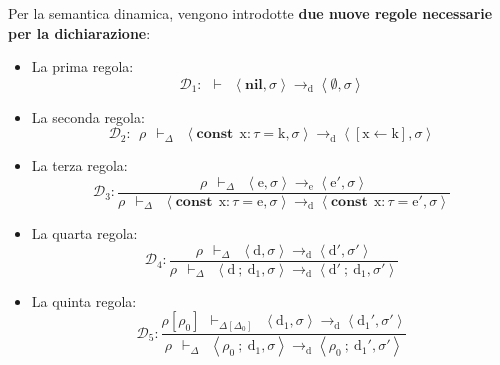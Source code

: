 \documentclass[a4paper]{article}
\begin{document}
 	Per la semantica dinamica, vengono introdotte \textbf{due nuove regole necessarie per la dichiarazione}:
 	\begin{itemize}
 		\item La prima regola:
 		\begin{equation*}
 			\mathcal{D}_{1}: \:\: \vdash \:\: \left\langle \mathbf{nil}, \sigma \right\rangle \rightarrow_{\mathrm{d}} \left\langle \emptyset, \sigma \right\rangle
 		\end{equation*}
 	
 		\item La seconda regola:
 		\begin{equation*}
 			\mathcal{D}_{2} : \:\: \rho \:\: \vdash_{\Delta} \:\: \left\langle \mathbf{const} \:\: \mathrm{x} : \tau = \mathrm{k}, \sigma \right\rangle \rightarrow_{\mathrm{d}} \left\langle \left[ \mathrm{x} \leftarrow \mathrm{k} \right], \sigma \right\rangle
 		\end{equation*}
 	
 		\item La terza regola:
 		\begin{equation*}
 			\mathcal{D}_{3} : \dfrac{
 				\rho \:\: \vdash_{\Delta} \:\: \left\langle \mathrm{e}, \sigma \right\rangle \rightarrow_{\mathrm{e}} \left\langle \mathrm{e}', \sigma \right\rangle
 			}{
 				\rho \:\: \vdash_{\Delta} \:\: \left\langle \mathbf{const} \:\: \mathrm{x}:\tau = \mathrm{e}, \sigma \right\rangle \rightarrow_{\mathrm{d}} \left\langle \mathbf{const} \:\: \mathrm{x}:\tau = \mathrm{e}', \sigma \right\rangle
 			}
 		\end{equation*}
 	
 		\item La quarta regola:
 		\begin{equation*}
 			\mathcal{D}_{4} : \dfrac{
 				\rho \:\: \vdash_{\Delta} \:\: \left\langle \mathrm{d}, \sigma \right\rangle \rightarrow_{\mathrm{d}} \left\langle \mathrm{d}', \sigma' \right\rangle
 			}{
 				\rho \:\: \vdash_{\Delta} \:\: \left\langle \mathrm{d} \: \mathbf{;} \: \mathrm{d}_{1}, \sigma \right\rangle \rightarrow_{\mathrm{d}} \left\langle \mathrm{d}' \: \mathbf{;} \: \mathrm{d}_{1}, \sigma' \right\rangle
 			}
 		\end{equation*}
 		
 		\item La quinta regola:
 		\begin{equation*}
 			\mathcal{D}_{5} : \dfrac{
 				\rho\left[\rho_{0}\right] \:\: \vdash_{\Delta\left[\Delta_{0}\right]} \:\: \left\langle \mathrm{d}_{1}, \sigma \right\rangle \rightarrow_{\mathrm{d}} \left\langle \mathrm{d}_{1}', \sigma' \right\rangle
 			}{
 				\rho \:\: \vdash_{\Delta} \:\: \left\langle \rho_{0} \: \mathbf{;} \: \mathrm{d}_{1}, \sigma \right\rangle \rightarrow_{\mathrm{d}} \left\langle \rho_{0} \: \mathbf{;} \: \mathrm{d}_{1}', \sigma' \right\rangle
 			}
 		\end{equation*}
 		

\end{itemize}
\end{document}
